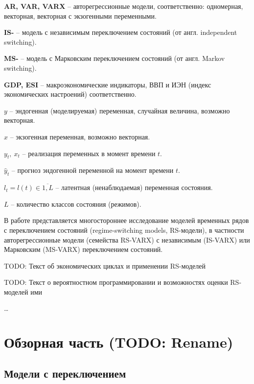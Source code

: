 \documentclass[a4paper,14pt]{extreport}
\begin{document}
\textbf{AR, VAR, VARX} -- авторегрессионные модели, соответственно: одномерная, векторная, векторная с экзогенными переменными.

\textbf{IS-} -- модель с независимым переключением состояний (от англ. independent switching).

\textbf{MS-} -- модель с Марковским переключением состояний (от англ. Markov switching).

\textbf{GDP, ESI} -- макроэкономические индикаторы, ВВП и ИЭН (индекс экономических настроений) соответственно.


$y$ -- эндогенная (моделируемая) переменная, случайная величина, возможно векторная.

$x$ -- экзогенная переменная, возможно векторная.

$y_t, \: x_t$ -- реализация переменных в момент времени $t$.

$\hat{y}_t$ -- прогноз эндогенной переменной на момент времени $t$.

$l_t = l(t) \in \overline{1,L}$ -- латентная (ненаблюдаемая) переменная состояния.

$L$ -- количество классов состояния (режимов).



В работе представляется многостороннее исследование моделей временных рядов с переключением состояний (regime-switching models, RS-модели), в частности авторегрессионные модели (семейства RS-VARX) с независимым (IS-VARX) или Марковским (MS-VARX) переключением состояний. 

TODO: Текст об экономических циклах и применении RS-моделей 

TODO: Текст о вероятностном программировании и возможностях оценки RS-моделей ими

\dots


\chapter{Обзорная часть (TODO: Rename)}

\section{Модели с переключением}
\end{document}
